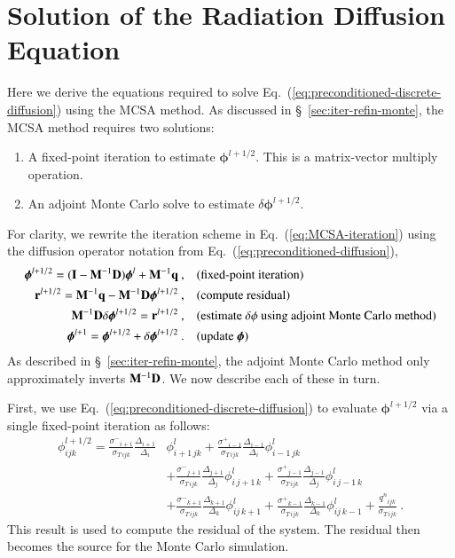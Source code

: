 \documentclass[preprint,12pt]{elsarticle}
\newcommand{\vr}{\ensuremath{\ve{r}}}
\newcommand{\vI}{\ensuremath{\ve{I}}}
\newcommand{\qn}{\ensuremath{q^n}} \newcommand{\Tn}{\ensuremath{T^n}}
\newcommand{\Di}{\ensuremath{\Delta_i}}
\newcommand{\Dj}{\ensuremath{\Delta_j}}
\newcommand{\Dk}{\ensuremath{\Delta_k}}
\newcommand{\sigT}{\ensuremath{\sigma_{T\,ijk}}}
\newcommand{\sigm}{\ensuremath{\sigma^{-}}}
\newcommand{\sigp}{\ensuremath{\sigma^{+}}}
\newcommand{\bphi}{\ensuremath{\boldsymbol{\phi}}}
\begin{document}
\section{Solution of the Radiation Diffusion Equation}
\label{sec:solut-radi-diff}

Here we derive the equations required to solve
Eq.~(\ref{eq:preconditioned-discrete-diffusion}) using the MCSA method.  As
discussed in \S~\ref{sec:iter-refin-monte}, the MCSA method requires two
solutions:
\begin{enumerate}
\item A fixed-point iteration to estimate $\bphi^{l+1/2}$.  This is a
  matrix-vector multiply operation.
\item An adjoint Monte Carlo solve to estimate $\delta\bphi^{l+1/2}$.
\end{enumerate}
For clarity, we rewrite the iteration scheme in
Eq.~(\ref{eq:MCSA-iteration}) using the diffusion operator notation
from Eq.~(\ref{eq:preconditioned-diffusion}),
\begin{align*}
   \bphi^{l+1/2} = (\vI - \ve{M}^{-1}\ve{D})\bphi^{l} +
  \ve{M}^{-1}\ve{q}\:, \quad & (\text{fixed-point iteration})\\ 
  \vr^{l+1/2} = \ve{M}^{-1}\ve{q} - \ve{M}^{-1}\ve{D}\bphi^{l+1/2}\:,
  \quad & (\text{compute residual})\\ 
  \ve{M}^{-1}\ve{D}\delta\bphi^{l+1/2} = \vr^{l+1/2}\:, \quad&
  (\text{estimate $\delta\phi$ using adjoint Monte Carlo method})\\ 
  \bphi^{l+1} = \bphi^{l+1/2} + \delta\bphi^{l+1/2}\:. \quad&
  (\text{update}\ \bphi)
\end{align*}
As described in \S~\ref{sec:iter-refin-monte}, the adjoint Monte Carlo method
only approximately inverts $\mathbf{M}^{-1}\mathbf{D}$.  We now describe each of these
in turn.

First, we use Eq.~(\ref{eq:preconditioned-discrete-diffusion}) to evaluate
$\bphi^{l+1/2}$ via a single fixed-point iteration as follows:
\begin{equation}
  \begin{aligned}
    \phi_{ijk}^{l+1/2} =
    \frac{\sigm_{i+1}}{\sigT}\frac{\Delta_{i+1}}{\Di}&\phi_{i+1\,jk}^l
    +
    \frac{\sigp_{i-1}}{\sigT}\frac{\Delta_{i-1}}{\Di}\phi_{i-1\,jk}^l
    \\ &+
    \frac{\sigm_{j+1}}{\sigT}\frac{\Delta_{j+1}}{\Dj}\phi_{i\,j+1\,k}^l
    +
    \frac{\sigp_{j-1}}{\sigT}\frac{\Delta_{j-1}}{\Dj}\phi_{i\,j-1\,k}^l
    \\ &+
    \frac{\sigm_{k+1}}{\sigT}\frac{\Delta_{k+1}}{\Dk}\phi_{ij\,k+1}^l
    +
    \frac{\sigp_{k-1}}{\sigT}\frac{\Delta_{k-1}}{\Dk}\phi_{ij\,k-1}^l
    + \frac{\qn_{ijk}}{\sigT}\:.
  \end{aligned}
\end{equation}
This result is used to compute the residual of the system.  The residual then
becomes the source for the Monte Carlo simulation.
\end{document}

